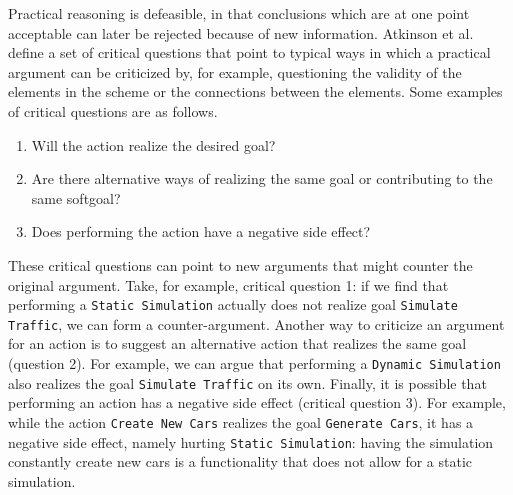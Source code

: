 Practical reasoning is defeasible, in that conclusions which are at one point acceptable can later be rejected because of new information. Atkinson et al.~\cite{atkinson2007} define a set of critical questions that point to typical ways in which a practical argument can be criticized by, for example, questioning the validity of the elements in the scheme or the connections between the elements. Some examples of critical questions are as follows.

\begin{enumerate}
\item Will the action realize the desired goal?
\item Are there alternative ways of realizing the same goal or contributing to the same softgoal?
\item Does performing the action have a negative side effect?
\end{enumerate}

These critical questions can point to new arguments that might counter the original argument. Take, for example, critical question 1: if we find that performing a \texttt{Static Simulation} actually does not realize goal \texttt{Simulate Traffic}, we can form a counter-argument. Another way to criticize an argument for an action is to suggest an alternative action that realizes the same goal (question 2). For example, we can argue that performing a \texttt{Dynamic Simulation} also realizes the goal \texttt{Simulate Traffic} on its own. Finally, it is possible that performing an action has a negative side effect (critical question 3). For example, while the action \texttt{Create New Cars} realizes the goal \texttt{Generate Cars}, it has a negative side effect, namely hurting \texttt{Static Simulation}: having the simulation constantly create new cars is a functionality that does not allow for a static simulation. 

